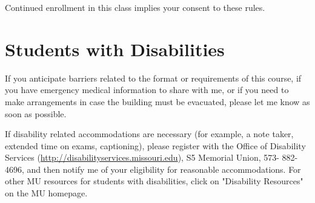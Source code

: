 \documentclass[11pt]{article}
\begin{document}
Continued enrollment in this class implies your consent to these rules.


\section{Students with Disabilities}

If you anticipate barriers related to the format or requirements of this course, if you have emergency medical information to share with me, or if you need to make arrangements in case the building must be evacuated, please let me know as soon as possible.

If disability related accommodations are necessary (for example, a note taker, extended time on exams, captioning), please register with the Office of Disability Services (\url{http://disabilityservices.missouri.edu}), S5 Memorial Union, 573- 882-4696, and then notify me of your eligibility for reasonable accommodations.  For other MU resources for students with disabilities, click on "Disability Resources" on the MU homepage.
\end{document}
